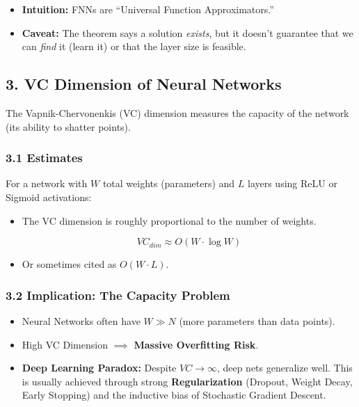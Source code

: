 \documentclass[
  italian,
  11pt,
]{article}
\begin{document}
\begin{itemize}
\item
  \textbf{Intuition:} FNNs are ``Universal Function Approximators.''
\item
  \textbf{Caveat:} The theorem says a solution \emph{exists}, but it
  doesn't guarantee that we can \emph{find} it (learn it) or that the
  layer size is feasible.
\end{itemize}

\subsection{3. VC Dimension of Neural
Networks}\label{vc-dimension-of-neural-networks}

The Vapnik-Chervonenkis (VC) dimension measures the capacity of the
network (its ability to shatter points).

\subsubsection{3.1 Estimates}\label{estimates}

For a network with \(W\) total weights (parameters) and \(L\) layers
using ReLU or Sigmoid activations:

\begin{itemize}
\item
  The VC dimension is roughly proportional to the number of weights.

  \[VC_{dim} \approx O(W \cdot \log W)\]
\item
  Or sometimes cited as \(O(W \cdot L)\).
\end{itemize}

\subsubsection{3.2 Implication: The Capacity
Problem}\label{implication-the-capacity-problem}

\begin{itemize}
\item
  Neural Networks often have \(W \gg N\) (more parameters than data
  points).
\item
  High VC Dimension \(\implies\) \textbf{Massive Overfitting Risk}.
\item
  \textbf{Deep Learning Paradox:} Despite \(VC \to \infty\), deep nets
  generalize well. This is usually achieved through strong
  \textbf{Regularization} (Dropout, Weight Decay, Early Stopping) and
  the inductive bias of Stochastic Gradient Descent.
\end{itemize}
\end{document}
